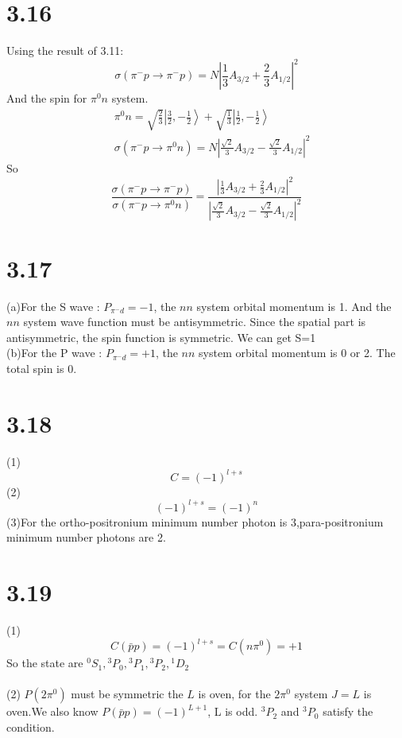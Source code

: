 \documentclass{article}
\begin{document}
\begin{CJK*}{GBK}{song}
\section{3.16}
Using the result of 3.11:
\begin{equation}
\sigma(\pi^-p\rightarrow\pi^-p)=N\left|\frac{1}{3}A_{3/2}+\frac{2}{3}A_{1/2}\right|^2
\end{equation}
And the spin for $\pi^0n$ system.
\begin{equation}
\begin{aligned}
&\pi^0n=\sqrt{\frac{2}{3}}\left|\frac{3}{2},-\frac{1}{2}\right\rangle+\sqrt{\frac{1}{3}}\left|\frac{1}{2},-\frac{1}{2}\right\rangle\\\
&\sigma(\pi^-p\rightarrow\pi^0n)=N\left|\frac{\sqrt{2}}{3}A_{3/2}-\frac{\sqrt{2}}{3}A_{1/2}\right|^2
\end{aligned}
\end{equation}
So
\begin{equation}
\frac{\sigma(\pi^-p\rightarrow\pi^-p)}{\sigma(\pi^-p\rightarrow\pi^0n)}=\frac{\left|\frac{1}{3}A_{3/2}+\frac{2}{3}A_{1/2}\right|^2}{\left|\frac{\sqrt{2}}{3}A_{3/2}-\frac{\sqrt{2}}{3}A_{1/2}\right|^2}
\end{equation}


\section{3.17}
(a)For the S wave : $P_{\pi^-d}=-1$, the $nn$ system orbital momentum is 1. And the $nn$ system wave function must be antisymmetric. Since the spatial part is antisymmetric, the  spin function is symmetric. We can get S=1\\
(b)For the P wave : $P_{\pi^-d}=+1$, the $nn$ system orbital momentum is 0 or 2. The total spin is 0.



\section{3.18}
(1)
\begin{equation}
C=(-1)^{l+s}
\end{equation}
(2)
\begin{equation}
(-1)^{l+s}=(-1)^n
\end{equation}
(3)For the ortho-positronium minimum number photon is 3,para-positronium minimum number photons are 2.

\section{3.19}
(1)
\begin{equation}
C(\bar{p}p)=(-1)^{l+s}=C(n\pi^0)=+1
\end{equation}
So the state are ${}^0S_1,{}^3P_0,{}^3P_1,{}^3P_2,{}^1D_2$\\\\
(2)
$P(2\pi^0)$ must be symmetric the $L$ is oven, for the $2\pi^0$ system  $J=L$ is oven.We also know $P(\bar{p}p)=(-1)^{L+1}$, L is odd.  ${}^3P_2$ and ${}^3P_0$ satisfy the condition.


\end{CJK*}
\end{document}
